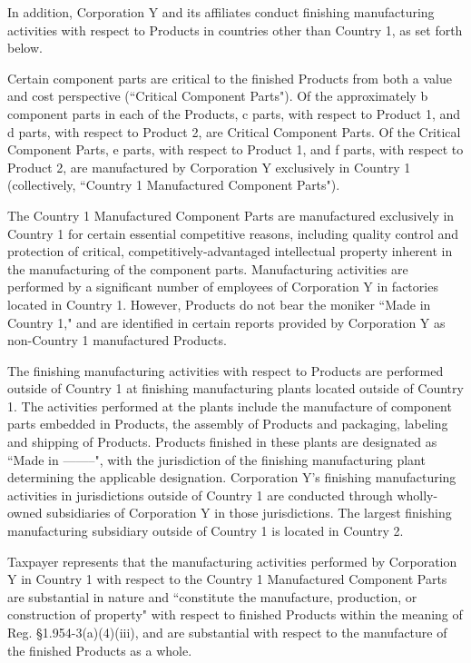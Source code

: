 \begin{select}
In addition, Corporation Y and its affiliates conduct finishing manufacturing activities with respect to Products in countries other than Country 1, as set forth below.

Certain component parts are critical to the finished Products from both a value and cost perspective (``Critical Component Parts"). Of the approximately b component parts in each of the Products, c parts, with respect to Product 1, and d parts, with respect to Product 2, are Critical Component Parts. Of the Critical Component Parts, e parts, with respect to Product 1, and f parts, with respect to Product 2, are manufactured by Corporation Y exclusively in Country 1 (collectively, ``Country 1 Manufactured Component Parts").

The Country 1 Manufactured Component Parts are manufactured exclusively in Country 1 for certain essential competitive reasons, including quality control and protection of critical, competitively-advantaged intellectual property inherent in the manufacturing of the component parts. Manufacturing activities are performed by a significant number of employees of Corporation Y in factories located in Country 1. However, Products do not bear the moniker ``Made in Country 1," and are identified in certain reports provided by Corporation Y as non-Country 1 manufactured Products.

The finishing manufacturing activities with respect to Products are performed outside of Country 1 at finishing manufacturing plants located outside of Country 1. The activities performed at the plants include the manufacture of component parts embedded in Products, the assembly of Products and packaging, labeling and shipping of Products. Products finished in these plants are designated as ``Made in --------", with the jurisdiction of the finishing manufacturing plant determining the applicable designation. Corporation Y's finishing manufacturing activities in jurisdictions outside of Country 1 are conducted through wholly-owned subsidiaries of Corporation Y in those jurisdictions. The largest finishing manufacturing subsidiary outside of Country 1 is located in Country 2.

Taxpayer represents that the manufacturing activities performed by Corporation Y in Country 1 with respect to the Country 1 Manufactured Component Parts are substantial in nature and ``constitute the manufacture, production, or construction of property" with respect to finished Products within the meaning of Reg. \S1.954-3(a)(4)(iii), and are substantial with respect to the manufacture of the finished Products as a whole.


\end{select}
